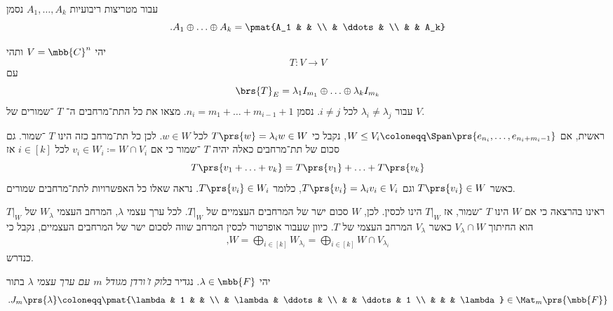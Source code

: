\documentclass[a4paper,10pt,twoside,openany]{book}
\begin{document}
\begin{notation}
עבור מטריצות ריבועיות
$A_1, \ldots, A_k$
נסמן
\[\text{.} A_1 \oplus \ldots \oplus A_k = \pmat{A_1 & & \\ & \ddots & \\ & & A_k}\]
\end{notation}

\begin{exercisechap}
יהי
$V = \mbb{C}^n$
ותהי
\[T \colon V \to V\]
עם
\[\brs{T}_E = \lambda_1 I_{m_1} \oplus \ldots \oplus \lambda_k I_{m_k}\]
עבור
$\lambda_i \neq \lambda_j$
לכל
$i \neq j$.
נסמן
$n_i = m_1 + \ldots + m_{i-1} + 1$.
מצאו את כל התת־מרחבים ה־%
$T$%
־שמורים של
$V$.
\end{exercisechap}

\begin{solution}
ראשית, אם
$W \leq V_i \coloneqq \Span\prs{e_{n_i}, \ldots, e_{n_i + m_i - 1}}$,
נקבל כי
$T\prs{w} = \lambda_i w \in W$
לכל
$w \in W$.
לכן כל תת־מרחב כזה הינו
$T$%
־שמור.
גם סכום של תת־מרחבים כאלה יהיה
$T$%
־שמור כי אם
$v_i \in W_i \coloneqq W \cap V_i$
לכל
$i \in [k]$
אז
\[T\prs{v_1 + \ldots + v_k} = T\prs{v_1} + \ldots + T\prs{v_k}\]
כאשר
$T\prs{v_i} \in W$
וגם
$T\prs{v_i} = \lambda_i v_i \in V_i$,
כלומר
$T\prs{v_i} \in W_i$.
נראה שאלו כל האפשרויות לתת־מרחבים שמורים.

ראינו בהרצאה כי אם
$W$
הינו
$T$%
־שמור, אז
$\left. T \right|_W$
הינו לכסין.
לכן,
$W$
סכום ישר של המרחבים העצמיים של
$\left. T \right|_W$.
לכל ערך עצמי
$\lambda$,
המרחב העצמי
$W_{\lambda}$
של
$\left. T \right|_W$
הוא החיתוך
$V_\lambda \cap W$
כאשר
$V_\lambda$
המרחב העצמי של
$T$.
כיוון שעבור אופרטור לכסין המרחב שווה לסכום ישר של המרחבים העצמיים, נקבל כי
\begin{align*}
\text{,} W = \bigoplus_{i \in [k]} W_{\lambda_i} = \bigoplus_{i \in [k]} W \cap V_{\lambda_i}
\end{align*}
כנדרש.
\end{solution}

\begin{definition}
יהי
$\lambda \in \mbb{F}$.
נגדיר
\emph{בלוק ז'ורדן מגודל
$m$
עם ערך עצמי
$\lambda$}
בתור
\begin{align*}
\text{.} J_m\prs{\lambda} \coloneqq \pmat{\lambda & 1 & & \\ & \lambda & \ddots & \\ & & \ddots & 1 \\ & & & \lambda} \in \Mat_m\prs{\mbb{F}}
\end{align*}
\end{definition}
\end{document}
